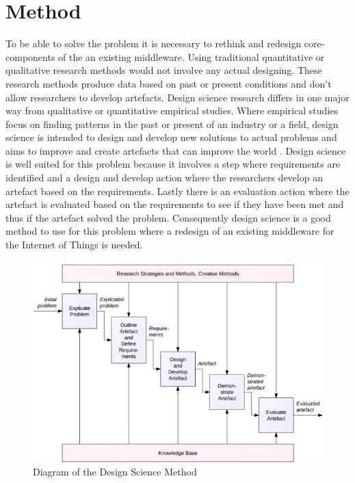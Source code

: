 \chapter{Method}
To be able to solve the problem it is necessary to rethink and redesign core-components of the an existing middleware. Using traditional quantitative or qualitative research methods would not involve any actual designing. These research methods produce data based on past or present conditions and don't allow researchers to develop artefacts.
Design science research differs in one major way from qualitative or quantitative empirical studies. Where empirical studies focus on finding patterns in the past or present of an industry or a field, design science is intended to design and develop new solutions to actual problems \cite{bider2012design} and aims to improve and create artefacts that can improve the world \cite{johannesson2012design}. 
Design science is well suited for this problem because it involves a step where requirements are identified and a design and develop action where the researchers develop an artefact based on the requirements. Lastly there is an evaluation action where the artefact is evaluated based on the requirements to see if they have been met and thus if the artefact solved the problem. Consequently design science is a good method to use for this problem where a redesign of an existing middleware for the Internet of Things is needed.

\begin{figure}[h!]
	\centering
    	\includegraphics[scale=0.50]{part_3/design_science.png}
		\caption{Diagram of the Design Science Method \cite{johannesson2012design}} 
		\label{ds}
\end{figure}

